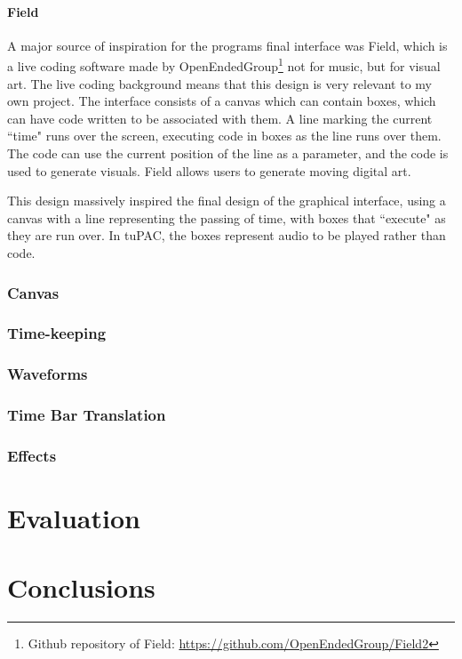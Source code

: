 \documentclass[12pt,a4paper,twoside,openright]{report}
\begin{document}
\subsubsection{Field}
A major source of inspiration for the programs final interface was Field, which is a live coding software made by OpenEndedGroup\footnote{Github repository of Field: \url{https://github.com/OpenEndedGroup/Field2}} not for music, but for visual art. The live coding background means that this design is very relevant to my own project. The interface consists of a canvas which can contain boxes, which can have code written to be associated with them. A line marking the current ``time" runs over the screen, executing code in boxes as the line runs over them. The code can use the current position of the line as a parameter, and the code is used to generate visuals. Field allows users to generate moving digital art.

This design massively inspired the final design of the graphical interface, using a canvas with a line representing the passing of time, with boxes that ``execute" as they are run over. In tuPAC, the boxes represent audio to be played rather than code.

\subsection{Canvas}
\subsection{Time-keeping}
\subsection{Waveforms}
\subsection{Time Bar Translation}
\subsection{Effects}
\chapter{Evaluation}



\chapter{Conclusions}
\end{document}
